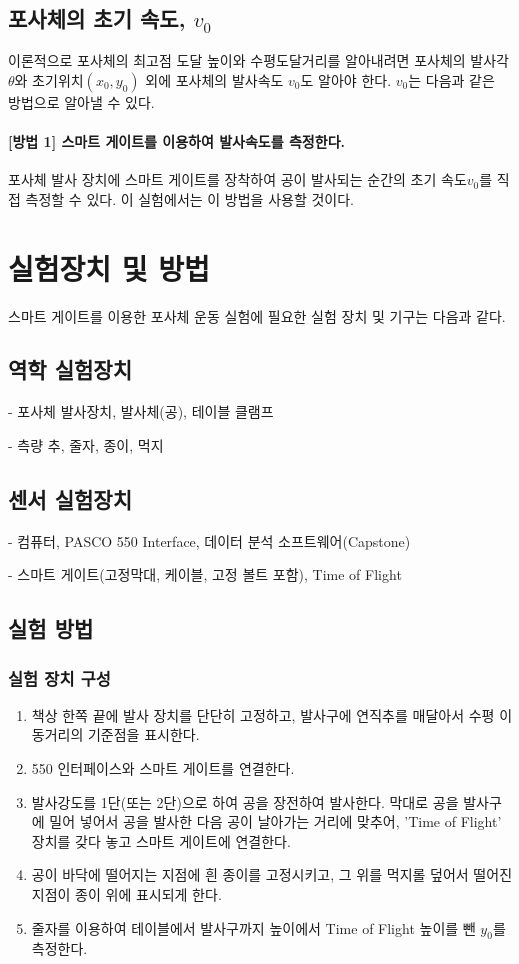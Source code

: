\documentclass[12pt,a4paper]{article}
\begin{document}
\subsection{포사체의 초기 속도, $v_0$}
이론적으로 포사체의 최고점 도달 높이와 수평도달거리를 알아내려면 포사체의 발사각 $\theta$와 초기위치$(x_0,y_0)$ 외에 포사체의
발사속도 $v_0$도 알아야 한다. $v_0$는 다음과 같은 방법으로 알아낼 수 있다.
\paragraph{[방법 1] 스마트 게이트를 이용하여 발사속도를 측정한다.}
\begin{flushleft}
포사체 발사 장치에 스마트 게이트를 장착하여 공이 발사되는 순간의 초기 속도$v_0$를 직접 측정할 수 있다.
이 실험에서는 이 방법을 사용할 것이다.
\end{flushleft}
\section{실험장치 및 방법}
스마트 게이트를 이용한 포사체 운동 실험에 필요한 실험 장치 및 기구는 다음과 같다.
\subsection{역학 실험장치}
    - 포사체 발사장치, 발사체(공), 테이블 클램프

    - 측량 추, 줄자, 종이, 먹지
\subsection{센서 실험장치}
    - 컴퓨터, PASCO 550 Interface, 데이터 분석 소프트웨어(Capstone)

    - 스마트 게이트(고정막대, 케이블, 고정 볼트 포함), Time of Flight
\subsection{실험 방법}
\subsubsection{실험 장치 구성}
\begin{enumerate}
    \item 책상 한쪽 끝에 발사 장치를 단단히 고정하고, 발사구에 연직추를 매달아서 수평 이동거리의 기준점을 표시한다.
    \item 550 인터페이스와 스마트 게이트를 연결한다.
    \item 발사강도를 1단(또는 2단)으로 하여 공을 장전하여 발사한다. 막대로 공을 발사구에 밀어 넣어서 공을 발사한 다음 공이
    날아가는 거리에 맞추어, 'Time of Flight' 장치를 갖다 놓고 스마트 게이트에 연결한다.
    \item 공이 바닥에 떨어지는 지점에 흰 종이를 고정시키고, 그 위를 먹지롤 덮어서 떨어진 지점이 종이 위에 표시되게 한다.
    \item 줄자를 이용하여 테이블에서 발사구까지 높이에서 Time of Flight 높이를 뺀 $y_0$를 측정한다.
\end{enumerate}
\end{document}
